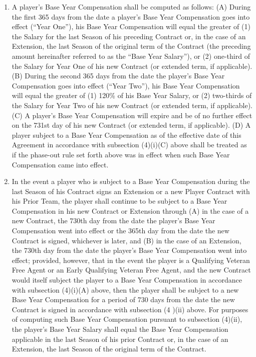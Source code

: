 \documentclass[
]{book}
\providecommand{\tightlist}{%
  \setlength{\itemsep}{0pt}\setlength{\parskip}{0pt}}
\begin{document}
\begin{enumerate}
  \begin{enumerate}
  \def\labelenumii{(\roman{enumii})}
  \setcounter{enumii}{1}
  \tightlist
  \item
    A player's Base Year Compensation shall be computed as follows:
    (A) During the first 365 days from the date a player's Base Year Compensation goes into effect (``Year One''), his Base Year Compensation will equal the greater of (1) the Salary for the last Season of his preceding Contract or, in the case of an Extension, the last Season of the original term of the Contract (the preceding amount hereinafter referred to as the ``Base Year Salary''), or (2) one-third of the Salary for Year One of his new Contract (or extended term, if applicable).
    (B) During the second 365 days from the date the player's Base Year Compensation goes into effect (``Year Two''), his Base Year Compensation will equal the greater of (1) 120\% of his Base Year Salary, or (2) two-thirds of the Salary for Year Two of his new Contract (or extended term, if applicable).
    (C) A player's Base Year Compensation will expire and be of no further effect on the 731st day of his new Contract (or extended term, if applicable).
    (D) A player subject to a Base Year Compensation as of the effective date of this Agreement in accordance with subsection (4)(i)(C) above shall be treated as if the phase-out rule set forth above was in effect when such Base Year Compensation came into effect.
  \item
    In the event a player who is subject to a Base Year Compensation during the last Season of his Contract signs an Extension or a new Player Contract with his Prior Team, the player shall continue to be subject to a Base Year Compensation in his new Contract or Extension through (A) in the case of a new Contract, the 730th day from the date the player's Base Year Compensation went into effect or the 365th day from the date the new Contract is signed, whichever is later, and (B) in the case of an Extension, the 730th day from the date the player's Base Year Compensation went into effect; provided, however, that in the event the player is a Qualifying Veteran Free Agent or an Early Qualifying Veteran Free Agent, and the new Contract would itself subject the player to a Base Year Compensation in accordance with subsection (4)(i)(A) above, then the player shall be subject to a new Base Year Compensation for a period of 730 days from the date the new Contract is signed in accordance with subsection (4 )(ii) above. For purposes of computing such Base Year Compensation pursuant to subsection (4)(ii), the player's Base Year Salary shall equal the Base Year Compensation applicable in the last Season of his prior Contract or, in the case of an Extension, the last Season of the original term of the Contract.

\end{enumerate}
\end{enumerate}
\end{document}
